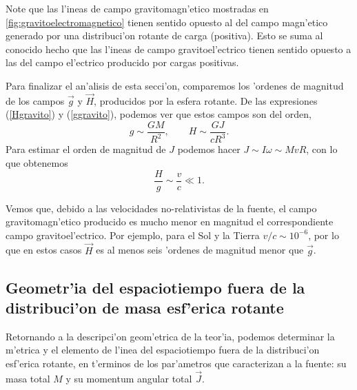 Note que las l'ineas de campo gravitomagn'etico mostradas en \ref{fig:gravitoelectromagnetico} tienen sentido opuesto al del campo magn'etico generado por una distribuci'on rotante de carga (positiva). Esto se suma al conocido hecho que las l'ineas de campo gravitoel'ectrico tienen sentido opuesto a las del campo el'ectrico producido por cargas positivas.

Para finalizar el an'alisis de esta secci'on, comparemos los 'ordenes de magnitud de los campos $\vec{g}$ y $\vec{H}$, producidos por la esfera rotante. De las expresiones (\ref{Hgravito}) y (\ref{ggravito}), podemos ver que estos campos son del orden,
\begin{equation}\label{magg}
g\sim \frac{GM}{R^2}, \qquad H\sim \frac{GJ}{cR^3}.
\end{equation}
Para estimar el orden de magnitud de $J$ podemos hacer $J\sim I\omega\sim MvR$, con lo que obtenemos
\begin{equation}
\frac{H}{g}\sim\frac{v}{c}\ll 1.
\end{equation}

Vemos que, debido a las velocidades no-relativistas de la fuente, el campo gravitomagn'etico producido es mucho menor en magnitud el correspondiente campo gravitoel'ectrico. Por ejemplo, para el Sol y la Tierra $v/c\sim10^{-6}$, por lo que en estos casos $\vec{H}$ es al menos seis 'ordenes de magnitud menor que $\vec{g}$.

\subsection{Geometr'ia del espaciotiempo fuera de la distribuci'on de masa esf'erica rotante}

Retornando a la descripci'on geom'etrica de la teor'ia, podemos determinar la m'etrica  y el elemento de l'inea del espaciotiempo fuera de la distribuci'on esf'erica rotante, en t'erminos de los par'ametros que caracterizan a la fuente: su masa total $M$ y su momentum angular total $\vec{J}$.


